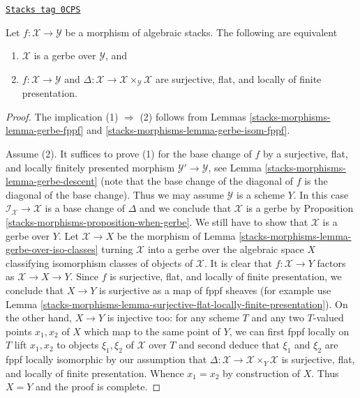 \begin{proposition}
\label{stacks-morphisms-proposition-when-gerbe-over}
\href{https://stacks.math.columbia.edu/tag/0CPS}{\texttt{Stacks tag 0CPS}}

Let $f : \mathcal{X} \to \mathcal{Y}$ be a morphism of algebraic stacks.
The following are equivalent
\begin{enumerate}
\item $\mathcal{X}$ is a gerbe over $\mathcal{Y}$, and
\item $f : \mathcal{X} \to \mathcal{Y}$ and
$\Delta : \mathcal{X} \to \mathcal{X} \times_\mathcal{Y} \mathcal{X}$
are surjective, flat, and locally of finite presentation.
\end{enumerate}
\end{proposition}

\begin{proof}
The implication (1) $\Rightarrow$ (2) follows from
Lemmas \ref{stacks-morphisms-lemma-gerbe-fppf} and \ref{stacks-morphisms-lemma-gerbe-isom-fppf}.

\medskip\noindent
Assume (2). It suffices to prove (1) for the base change of $f$
by a surjective, flat, and locally finitely presented morphism
$\mathcal{Y}' \to \mathcal{Y}$, see
Lemma \ref{stacks-morphisms-lemma-gerbe-descent} (note that the base change
of the diagonal of $f$ is the diagonal of the base change).
Thus we may assume $\mathcal{Y}$ is a scheme $Y$.
In this case $\mathcal{I}_\mathcal{X} \to \mathcal{X}$
is a base change of $\Delta$ and
we conclude that $\mathcal{X}$ is a gerbe
by Proposition \ref{stacks-morphisms-proposition-when-gerbe}.
We still have to show that $\mathcal{X}$ is a gerbe over $Y$.
Let $\mathcal{X} \to X$ be the morphism of
Lemma \ref{stacks-morphisms-lemma-gerbe-over-iso-classes}
turning $\mathcal{X}$ into a gerbe over the algebraic space $X$
classifying isomorphism classes of objects of $\mathcal{X}$.
It is clear that $f : \mathcal{X} \to Y$ factors as
$\mathcal{X} \to X \to Y$. Since $f$ is surjective, flat, and
locally of finite presentation, we conclude that $X \to Y$ is
surjective as a map of fppf sheaves (for example use
Lemma \ref{stacks-morphisms-lemma-surjective-flat-locally-finite-presentation}).
On the other hand, $X \to Y$ is injective too: for any scheme
$T$ and any two $T$-valued points $x_1, x_2$ of $X$ which map to
the same point of $Y$, we can first fppf locally on $T$
lift $x_1, x_2$ to objects $\xi_1, \xi_2$ of $\mathcal{X}$ over $T$
and second deduce that $\xi_1$ and $\xi_2$ are fppf locally isomorphic
by our assumption that
$\Delta : \mathcal{X} \to \mathcal{X} \times_Y \mathcal{X}$
is surjective, flat, and locally of finite presentation.
Whence $x_1 = x_2$ by construction of $X$.
Thus $X = Y$ and the proof is complete.
\end{proof}

